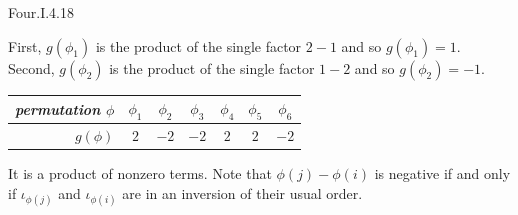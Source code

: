 \begin{ans}{Four.I.4.18}
      \begin{exparts}
        \partsitem First, $g(\phi_1)$ is the product of the single
          factor $2-1$ and so $g(\phi_1)=1$.
          Second, $g(\phi_2)$ is the product of the single
          factor $1-2$ and so $g(\phi_2)=-1$.
        \partsitem
            \begin{tabular}[t]{r|cccccc}
               \textit{permutation $\phi$}
                 &$\phi_{1}$ &$\phi_{2}$ &$\phi_{3}$
                    &$\phi_{4}$ &$\phi_{5}$ &$\phi_{6}$ \\
               \hline
               $g(\phi)$ &$2$ &$-2$ &$-2$ &$2$ &$2$ &$-2$
            \end{tabular}
        \partsitem It is a product of nonzero terms.
        \partsitem Note that \( \phi(j)-\phi(i) \) is negative if and only if
           \( \iota_{\phi(j)} \) and \( \iota_{\phi(i)} \) are in an inversion
           of their usual order.
      \end{exparts}
     
\end{ans}
